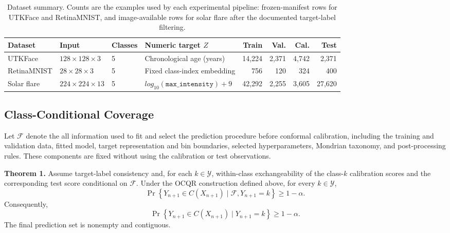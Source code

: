 \documentclass[conference]{IEEEtran}
\begin{document}
\begin{table}[t]
\centering
\caption{Dataset summary. Counts are the examples used by each experimental pipeline: frozen-manifest rows for UTKFace and RetinaMNIST, and image-available rows for solar flare after the documented target-label filtering.}
\label{tab:dataset_summary}
\begin{tabular}{lllp{4.0cm}rrrr}
\toprule
Dataset & Input & Classes & Numeric target $Z$ & Train & Val. & Cal. & Test \\
\midrule
UTKFace & $128\times128\times3$& 5 & Chronological age (years) & 14{,}224 & 2{,}371 & 4{,}742 & 2{,}371 \\
RetinaMNIST & $28\times28\times 3$& 5 & Fixed class-index embedding& 756 & 120 & 324 & 400 \\
Solar flare & $224\times224\times13$ & 5 & \(log_{10}(\texttt{max\_intensity})+9\)& 42{,}292 & 2{,}255 & 3{,}605 & 27{,}620 \\
\bottomrule
\end{tabular}
\end{table}

\subsection{Class-Conditional Coverage}
\label{subsec:coverage_guarantee}

Let \(\mathcal{F}\) denote the all information used to fit and select the prediction procedure before conformal calibration, including the training and validation data, fitted model, target representation and bin boundaries, selected hyperparameters, Mondrian taxonomy, and post-processing rules. These components are fixed without using the calibration or test observations.

\noindent\textbf{Theorem 1.}
Assume target-label consistency and, for each \(k\in\mathcal{Y}\), within-class exchangeability of the class-\(k\) calibration scores and the corresponding test score conditional on \(\mathcal{F}\). Under the OCQR construction defined above, for every \(k\in\mathcal{Y}\),
\begin{equation}
\Pr\left\{
Y_{n+1}\in C(X_{n+1})
\mid
\mathcal{F},Y_{n+1}=k
\right\}
\ge 1-\alpha.
\label{eq:conditional_coverage}
\end{equation}
Consequently,
\begin{equation}
\Pr\left\{
Y_{n+1}\in C(X_{n+1})
\mid
Y_{n+1}=k
\right\}
\ge 1-\alpha.
\label{eq:label_conditional_coverage}
\end{equation}
The final prediction set is nonempty and contiguous.
\end{document}
